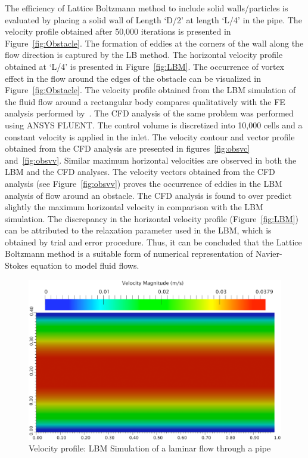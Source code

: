 The efficiency of Lattice Boltzmann method to include solid walls/particles is evaluated by placing a solid wall of Length `D/2' at length `L/4' in the pipe. The velocity profile obtained after 50,000 iterations is presented in Figure~\ref{fig:Obstacle}. The formation of eddies at the corners of the wall along the flow direction is captured by the LB method. The horizontal velocity profile obtained at `L/4' is presented in Figure~\ref{fig:LBM}. The occurrence of vortex effect in the flow around the edges of the obstacle can be visualized in Figure~\ref{fig:Obstacle}. The velocity profile obtained from the LBM simulation of the fluid flow around a rectangular body compares qualitatively with the FE analysis performed by~\citet{zhong1991}. The CFD analysis of the same problem was performed using ANSYS FLUENT. The control volume is discretized into 10,000 cells and a constant velocity is applied in the inlet. The velocity contour and vector profile obtained from the CFD analysis are presented in figures~\ref{fig:obsvc} and~\ref{fig:obsvv}. Similar maximum horizontal velocities are observed in both the LBM and the CFD analyses. The velocity vectors obtained from the CFD analysis (see Figure~\ref{fig:obsvv}) proves the occurrence of eddies in the LBM analysis of flow around an obstacle. The CFD analysis is found to over predict slightly the maximum horizontal velocity in comparison with the LBM simulation. The discrepancy in the horizontal velocity profile (Figure~\ref{fig:LBM}) can be attributed to the relaxation parameter used in the LBM, which is obtained by trial and error procedure. Thus, it can be concluded that the Lattice Boltzmann method is a suitable form of numerical representation of Navier-Stokes equation to model fluid flows. 
\begin{figure}[h]
\centering
\includegraphics[width=\textwidth]{Chapter3/figures/lbm/LBM_Poiseuille.png}
\caption{Velocity profile: LBM Simulation of a laminar flow through a pipe}
\label{fig:vel}
\end{figure}

